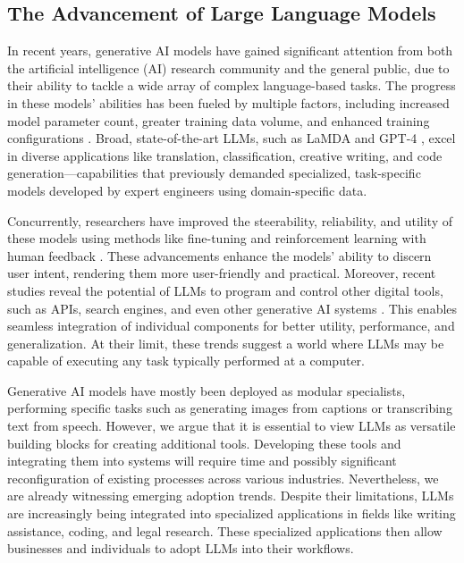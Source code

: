 \documentclass[11pt]{article}
\begin{document}
\subsection{The Advancement of Large Language Models}
\label{sec:llmlit}
In recent years, generative AI models have gained significant attention from both the artificial intelligence (AI) research community and the general public, due to their ability to tackle a wide array of complex language-based tasks. The progress in these models' abilities has been fueled by multiple factors, including increased model parameter count, greater training data volume, and enhanced training configurations \citep{brown2020language, radford2019language, hernandez2021scaling, kaplan2020scaling}. Broad, state-of-the-art LLMs, such as LaMDA \citep{thoppilan2022lamda} and GPT-4 \citep{gpt4}, excel in diverse applications like translation, classification, creative writing, and code generation—capabilities that previously demanded specialized, task-specific models developed by expert engineers using domain-specific data.

Concurrently, researchers have improved the steerability, reliability, and utility of these models using methods like fine-tuning and reinforcement learning with human feedback \citep{ouyang2022training, bai_training_2022}. These advancements enhance the models' ability to discern user intent, rendering them more user-friendly and practical. Moreover, recent studies reveal the potential of LLMs to program and control other digital tools, such as APIs, search engines, and even other generative AI systems \citep{schick2023toolformer, mialon2023augmented, langchain}. This enables seamless integration of individual components for better utility, performance, and generalization. At their limit, these trends suggest a world where LLMs may be capable of executing any task typically performed at a computer.

Generative AI models have mostly been deployed as modular specialists, performing specific tasks such as generating images from captions or transcribing text from speech. However, we argue that it is essential to view LLMs as versatile building blocks for creating additional tools. Developing these tools and integrating them into systems will require time and possibly significant reconfiguration of existing processes across various industries. Nevertheless, we are already witnessing emerging adoption trends. Despite their limitations, LLMs are increasingly being integrated into specialized applications in fields like writing assistance, coding, and legal research. These specialized applications then allow businesses and individuals to adopt LLMs into their workflows.
\end{document}
